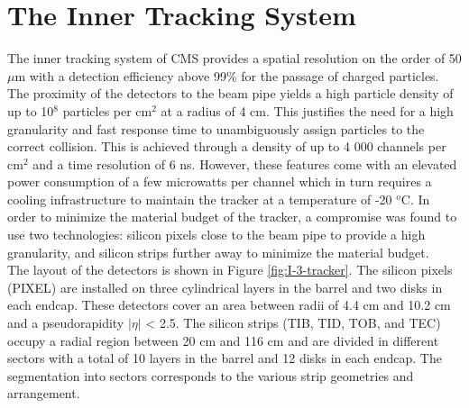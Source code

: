   \section{The Inner Tracking System}

    The inner tracking system of CMS provides a spatial resolution on the order of 50 $\mu$m with a detection efficiency above 99\% for the passage of charged particles. The proximity of the detectors to the beam pipe yields a high particle density of up to 10$^8$ particles per cm$^2$ at a radius of 4 cm. This justifies the need for a high granularity and fast response time to unambiguously assign particles to the correct collision. This is achieved through a density of up to 4 000 channels per cm$^2$  and a time resolution of 6 ns. However, these features come with an elevated power consumption of a few microwatts per channel which in turn requires a cooling infrastructure to maintain the tracker at a temperature of -20 $^o$C. In order to minimize the material budget of the tracker, a compromise was found to use two technologies: silicon pixels close to the beam pipe to provide a high granularity, and silicon strips further away to minimize the material budget. \\

    The layout of the detectors is shown in Figure \ref{fig:I-3-tracker}. The silicon pixels (PIXEL) are installed on three cylindrical layers in the barrel and two disks in each endcap. These detectors cover an area between radii of 4.4 cm and 10.2 cm and a pseudorapidity $|\eta|$ < 2.5. The silicon strips (TIB, TID, TOB, and TEC) occupy a radial region between 20 cm and 116 cm and are divided in different sectors with a total of 10 layers in the barrel and 12 disks in each endcap. The segmentation into sectors corresponds to the various strip geometries and arrangement. \\

